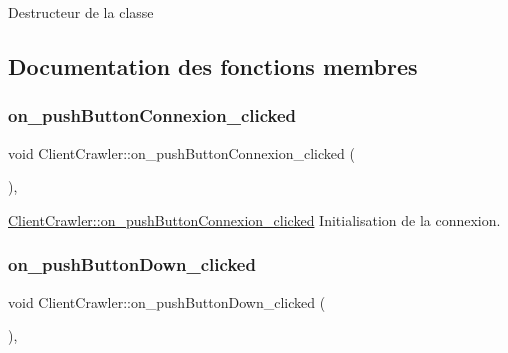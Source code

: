 Destructeur de la classe 

\subsection{Documentation des fonctions membres}
\mbox{\label{class_client_crawler_a0a5fe0345063d04e2c9acc5734b4a0d6}} 
\subsubsection{\texorpdfstring{on\+\_\+push\+Button\+Connexion\+\_\+clicked}{on\_pushButtonConnexion\_clicked}}
{\footnotesize\ttfamily void Client\+Crawler\+::on\+\_\+push\+Button\+Connexion\+\_\+clicked (\begin{DoxyParamCaption}{ }\end{DoxyParamCaption})\hspace{0.3cm}{\ttfamily [private]}, {\ttfamily [slot]}}



\hyperlink{class_client_crawler_a0a5fe0345063d04e2c9acc5734b4a0d6}{Client\+Crawler\+::on\+\_\+push\+Button\+Connexion\+\_\+clicked} Initialisation de la connexion. 

\mbox{\label{class_client_crawler_a3f9ad2ca60a388d5d3d0436af7dd3756}} 
\subsubsection{\texorpdfstring{on\+\_\+push\+Button\+Down\+\_\+clicked}{on\_pushButtonDown\_clicked}}
{\footnotesize\ttfamily void Client\+Crawler\+::on\+\_\+push\+Button\+Down\+\_\+clicked (\begin{DoxyParamCaption}{ }\end{DoxyParamCaption})\hspace{0.3cm}{\ttfamily [private]}, {\ttfamily [slot]}}



